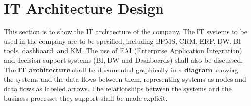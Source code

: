 
\section{IT Architecture Design} \label{sec:it_architecture}

This section is to show the IT architecture of the company.
The IT systems to be used in the company are to be specified, including BPMS, CRM, ERP, DW, BI tools, dashboard, and KM.
The use of EAI (Enterprise Application Integration) and decision support systems (BI, DW and Dashboards) shall also be discussed.
The \textbf{IT architecture} shall be documented graphically in a \textbf{diagram} showing the systems and the data flows between
them, representing systems as nodes and data flows as labeled arrows.
The relationships between the systems and the business processes they support shall be made explicit.

